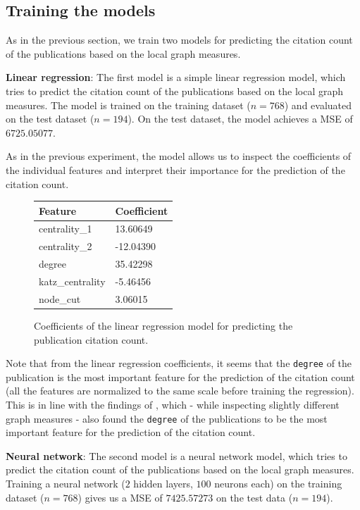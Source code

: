 \subsection{Training the models}

As in the previous section, we train two models for predicting the citation count of the publications based on the local graph measures.

\textbf{Linear regression}: The first model is a simple linear regression model, which tries to predict the citation count of the publications based on the local graph measures.
The model is trained on the training dataset ($n=768$) and evaluated on the test dataset ($n=194$). 
On the test dataset, the model achieves a \ac{MSE} of $6725.05077$.

As in the previous experiment, the model allows us to inspect the coefficients of the individual features and interpret their importance for the prediction of the citation count.

\begin{figure}[!ht]
    \captionsetup{width=.9\linewidth}
    \centering
    \begin{tabular}{|l|l|}
    \hline
        \textbf{Feature} & \textbf{Coefficient} \\ \hline
        centrality\_1 & 13.60649 \\ \hline
        centrality\_2 & -12.04390 \\ \hline
        degree & 35.42298 \\ \hline
        katz\_centrality & -5.46456 \\ \hline
        node\_cut & 3.06015 \\ \hline
    \end{tabular}
    \caption{Coefficients of the linear regression model for predicting the publication citation count.}
\end{figure}

Note that from the linear regression coefficients, it seems that the \texttt{degree} of the publication is the most important feature for the prediction of the citation count (all the features are normalized to the same scale before training the regression).
This is in line with the findings of \cite{ABBASI2011594}, which - while inspecting slightly different graph measures - also found the \texttt{degree} of the publications to be the most important feature for the prediction of the citation count.

\textbf{Neural network}: The second model is a neural network model, which tries to predict the citation count of the publications based on the local graph measures.
Training a neural network ($2$ hidden layers, $100$ neurons each) on the training dataset ($n=768$) gives us a \ac{MSE} of $7425.57273$ on the test data ($n=194$).

